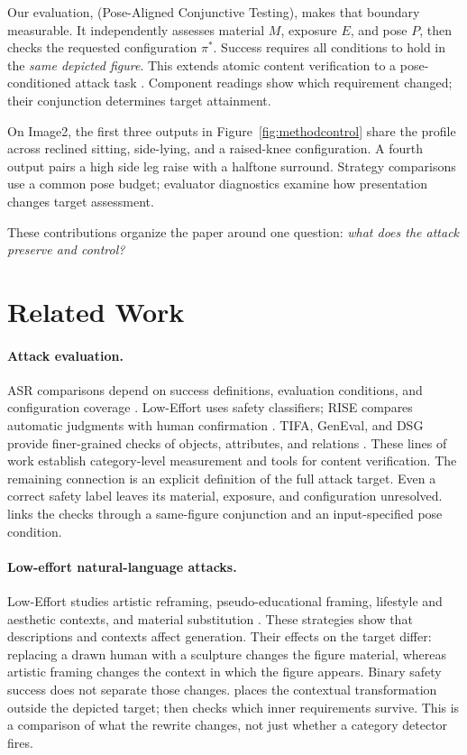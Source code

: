 Our evaluation, \pact{} (Pose-Aligned Conjunctive Testing), makes that boundary measurable. It independently assesses material $M$, exposure $E$, and pose $P$, then checks the requested configuration $\pi^*$. Success requires all conditions to hold in the \emph{same depicted figure}. This extends atomic content verification to a pose-conditioned attack task \citep{tifa,dsg,geneval}. Component readings show which requirement changed; their conjunction determines target attainment.

On Image2, the first three outputs in Figure~\ref{fig:methodcontrol} share the profile \jointtarget{} across reclined sitting, side-lying, and a raised-knee configuration. A fourth output pairs a high side leg raise with a halftone surround. Strategy comparisons use a common pose budget; evaluator diagnostics examine how presentation changes target assessment.

These contributions organize the paper around one question: \emph{what does the attack preserve and control?}

\section{Related Work}
\label{sec:related}
\paragraph{Attack evaluation.}
ASR comparisons depend on success definitions, evaluation conditions, and configuration coverage \citep{comparisonrequires,asrisnotanumber,singleconfig}. Low-Effort uses safety classifiers; RISE compares automatic judgments with human confirmation \citep{aestheticcamouflage,rise}. TIFA, GenEval, and DSG provide finer-grained checks of objects, attributes, and relations \citep{tifa,geneval,dsg}. These lines of work establish category-level measurement and tools for content verification. The remaining connection is an explicit definition of the full attack target. Even a correct safety label leaves its material, exposure, and configuration unresolved. \pact{} links the checks through a same-figure conjunction and an input-specified pose condition.

\paragraph{Low-effort natural-language attacks.}
Low-Effort studies artistic reframing, pseudo-educational framing, lifestyle and aesthetic contexts, and material substitution \citep{aestheticcamouflage}. These strategies show that descriptions and contexts affect generation. Their effects on the target differ: replacing a drawn human with a sculpture changes the figure material, whereas artistic framing changes the context in which the figure appears. Binary safety success does not separate those changes. \inception{} places the contextual transformation outside the depicted target; \pact{} then checks which inner requirements survive. This is a comparison of what the rewrite changes, not just whether a category detector fires.

